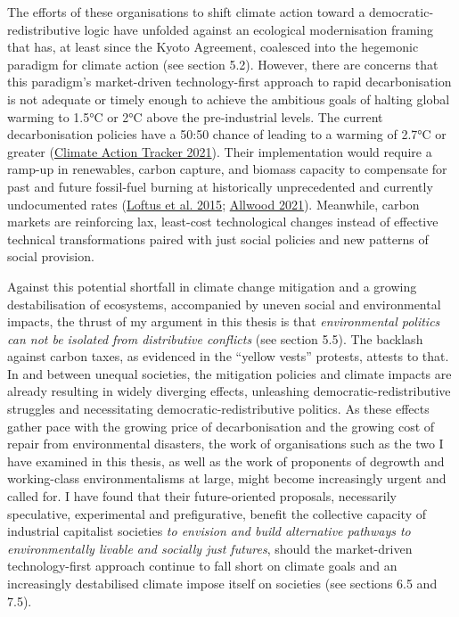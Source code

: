 \documentclass[a4paper, nobind]{templates/ociamthesis}
\begin{document}
The efforts of these organisations to shift climate action toward a democratic-redistributive logic have unfolded against an ecological modernisation framing that has, at least since the Kyoto Agreement, coalesced into the hegemonic paradigm for climate action (see section 5.2). However, there are concerns that this paradigm's market-driven technology-first approach to rapid decarbonisation is not adequate or timely enough to achieve the ambitious goals of halting global warming to 1.5°C or 2°C above the pre-industrial levels. The current decarbonisation policies have a 50:50 chance of leading to a warming of 2.7°C or greater (\protect\hyperlink{ref-climate_action_tracker_cat_2021}{Climate Action Tracker 2021}). Their implementation would require a ramp-up in renewables, carbon capture, and biomass capacity to compensate for past and future fossil-fuel burning at historically unprecedented and currently undocumented rates (\protect\hyperlink{ref-loftus_critical_2015}{Loftus et al. 2015}; \protect\hyperlink{ref-allwood_technology_2021}{Allwood 2021}). Meanwhile, carbon markets are reinforcing lax, least-cost technological changes instead of effective technical transformations paired with just social policies and new patterns of social provision.

Against this potential shortfall in climate change mitigation and a growing destabilisation of ecosystems, accompanied by uneven social and environmental impacts, the thrust of my argument in this thesis is that \emph{environmental politics can not be isolated from distributive conflicts} (see section 5.5). The backlash against carbon taxes, as evidenced in the ``yellow vests'' protests, attests to that. In and between unequal societies, the mitigation policies and climate impacts are already resulting in widely diverging effects, unleashing democratic-redistributive struggles and necessitating democratic-redistributive politics. As these effects gather pace with the growing price of decarbonisation and the growing cost of repair from environmental disasters, the work of organisations such as the two I have examined in this thesis, as well as the work of proponents of degrowth and working-class environmentalisms at large, might become increasingly urgent and called for. I have found that their future-oriented proposals, necessarily speculative, experimental and prefigurative, benefit the collective capacity of industrial capitalist societies \emph{to envision and build alternative pathways to environmentally livable and socially just futures}, should the market-driven technology-first approach continue to fall short on climate goals and an increasingly destabilised climate impose itself on societies (see sections 6.5 and 7.5).
\end{document}
